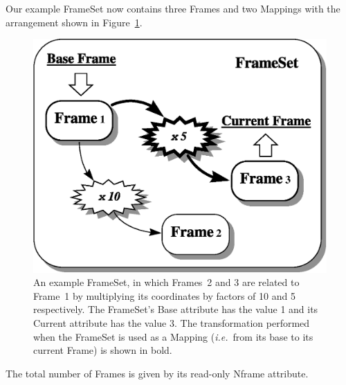 \documentclass[twoside,11pt]{article}
\newenvironment{latexonly}{}{}
\newcommand{\htmlref}[2]{#1}
\begin{document}
\begin{latexonly}
   Our example FrameSet now contains three Frames and two Mappings with
   the arrangement shown in Figure~\ref{fig:fsexample}.
   \begin{figure}
   \begin{center}
   \includegraphics[scale=0.6]{sun210_figures/fsexample.eps}
   \caption{An example FrameSet, in which Frames~2 and 3 are related to
   Frame~1 by multiplying its coordinates by factors of 10 and 5
   respectively. The FrameSet's \htmlref{Base}{Base} attribute has the value 1 and its
   \htmlref{Current}{Current} attribute has the value 3. The transformation performed when
   the FrameSet is used as a Mapping ({\em{i.e.}}\ from its base to
   its current Frame) is shown in bold.}
   \label{fig:fsexample}
   \end{center}
   \end{figure}
   The total number of Frames is given by its read-only \htmlref{Nframe}{Nframe} attribute.
\end{latexonly}
\end{document}
